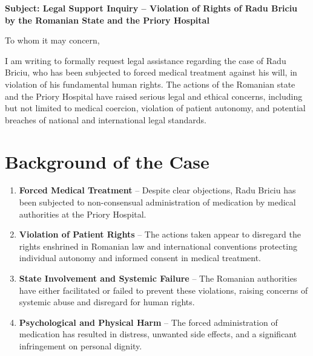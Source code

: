 \documentclass[11pt,letterpaper]{article}
\begin{document}
	
%	
%	
	
	\vspace{1cm}
	
	\begin{center}
		\textbf{Subject: Legal Support Inquiry – Violation of Rights of Radu Briciu by the Romanian State and the Priory Hospital}
	\end{center}
	
	\vspace{0.5cm}
	
	To whom it may concern,
	
	I am writing to formally request legal assistance regarding the case of Radu Briciu, who has been subjected to forced medical treatment against his will, in violation of his fundamental human rights. The actions of the Romanian state and the Priory Hospital have raised serious legal and ethical concerns, including but not limited to medical coercion, violation of patient autonomy, and potential breaches of national and international legal standards.
	
	\section*{Background of the Case}
	\begin{enumerate}
		\item \textbf{Forced Medical Treatment} – Despite clear objections, Radu Briciu has been subjected to non-consensual administration of medication by medical authorities at the Priory Hospital.
		\item \textbf{Violation of Patient Rights} – The actions taken appear to disregard the rights enshrined in Romanian law and international conventions protecting individual autonomy and informed consent in medical treatment.
		\item \textbf{State Involvement and Systemic Failure} – The Romanian authorities have either facilitated or failed to prevent these violations, raising concerns of systemic abuse and disregard for human rights.
		\item \textbf{Psychological and Physical Harm} – The forced administration of medication has resulted in distress, unwanted side effects, and a significant infringement on personal dignity.
	\end{enumerate}
	
\end{document}
